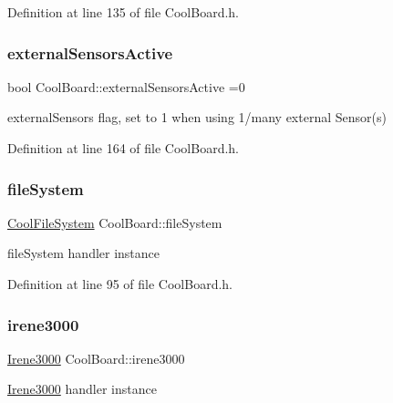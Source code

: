 Definition at line 135 of file Cool\+Board.\+h.

\mbox{\label{class_cool_board_a638b00b76aeb819ecfd4c10b8cdd7bb7}} 
\subsubsection{\texorpdfstring{external\+Sensors\+Active}{externalSensorsActive}}
{\footnotesize\ttfamily bool Cool\+Board\+::external\+Sensors\+Active =0\hspace{0.3cm}{\ttfamily [private]}}

external\+Sensors flag, set to 1 when using 1/many external Sensor(s) 

Definition at line 164 of file Cool\+Board.\+h.

\mbox{\label{class_cool_board_a42c2586fbb13ff7f06538e9284e8538d}} 
\subsubsection{\texorpdfstring{file\+System}{fileSystem}}
{\footnotesize\ttfamily \hyperlink{class_cool_file_system}{Cool\+File\+System} Cool\+Board\+::file\+System\hspace{0.3cm}{\ttfamily [private]}}

file\+System handler instance 

Definition at line 95 of file Cool\+Board.\+h.

\mbox{\label{class_cool_board_ad103718ce316006c4695b8eb312eaf11}} 
\subsubsection{\texorpdfstring{irene3000}{irene3000}}
{\footnotesize\ttfamily \hyperlink{class_irene3000}{Irene3000} Cool\+Board\+::irene3000\hspace{0.3cm}{\ttfamily [private]}}

\hyperlink{class_irene3000}{Irene3000} handler instance 

